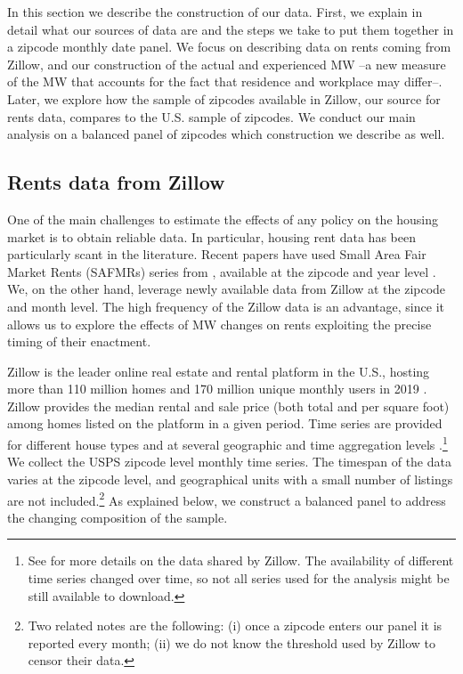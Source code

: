 
In this section we describe the construction of our data. First, we explain in detail
what our sources of data are and the steps we take to put them together in a zipcode
monthly date panel. We focus on describing data on rents coming from Zillow, and our
construction of the actual and experienced MW --a new measure of the MW that accounts
for the fact that residence and workplace may differ--. Later, we explore how the 
sample of zipcodes available in Zillow, our source for rents data, compares to the 
U.S. sample of zipcodes. We conduct our main analysis on a balanced panel of zipcodes 
which construction we describe as well.

\subsection{Rents data from Zillow}

One of the main challenges to estimate the effects of any policy on the housing market
is to obtain reliable data. In particular, housing rent data has been particularly scant
in the literature. Recent papers have used Small Area Fair Market Rents (SAFMRs) series 
from \textcite{hud}, available at the zipcode and year level \parencite{Tidemann2018, 
Yamagishi2019}. We, on the other hand, leverage newly available data from Zillow at the 
zipcode and month level. The high frequency of the Zillow data is an advantage, since it 
allows us to explore the effects of MW changes on rents exploiting the precise timing of 
their enactment.

Zillow is the leader online real estate and rental platform in the U.S., hosting more 
than 110 million homes and 170 million unique monthly users in 2019 
\parencite{ZillowFacts}. Zillow provides the median rental and sale price (both 
total and per square foot) among homes listed on the platform in a given period. Time 
series are provided for different house types and at several geographic and time 
aggregation levels \parencite{ZillowData}.\footnote{See \textcite{ZillowData} for 
	more details on the data shared by Zillow. The availability of different time 
	series changed over time, so not all series used for the analysis might be still 
	available to download.} 
We collect the USPS zipcode level monthly time series. The timespan of the data 
varies at the zipcode level, and geographical units with a small number of listings
are not included.\footnote{Two related notes are the following: (i) once a zipcode 
	enters our panel it is reported every month; (ii) we do not know the threshold
	used by Zillow to censor their data.} 
As explained below, we construct a balanced panel to address the changing composition 
of the sample.

